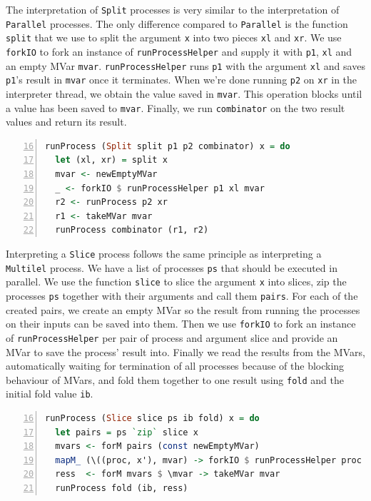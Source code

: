 The interpretation of \texttt{Split} processes is very similar to the interpretation of \texttt{Parallel} processes. The only difference compared to \texttt{Parallel} is the function \texttt{split} that we use to split the argument \texttt{x} into two pieces \texttt{xl} and \texttt{xr}. We use \texttt{forkIO} to fork an instance of \texttt{runProcessHelper} and supply it with \texttt{p1}, \texttt{xl} and an empty MVar \texttt{mvar}. \texttt{runProcessHelper} runs \texttt{p1} with the argument \texttt{xl} and saves \texttt{p1}'s result in \texttt{mvar} once it terminates. When we're done running \texttt{p2} on \texttt{xr} in the interpreter thread, we obtain the value saved in \texttt{mvar}. This operation blocks until a value has been saved to \texttt{mvar}. Finally, we run \texttt{combinator} on the two result values and return its result.
\begin{lstlisting}[language=Haskell,caption=Implementation of the interpreter for \texttt{Split} processes.,label=lst:local_runprocess_multilel,numbers=left,frame=bt,firstnumber=16]
runProcess (Split split p1 p2 combinator) x = do
  let (xl, xr) = split x
  mvar <- newEmptyMVar
  _ <- forkIO $ runProcessHelper p1 xl mvar
  r2 <- runProcess p2 xr
  r1 <- takeMVar mvar
  runProcess combinator (r1, r2)
\end{lstlisting}

Interpreting a \texttt{Slice} process follows the same principle as interpreting a \texttt{Multilel} process. We have a list of processes \texttt{ps} that should be executed in parallel. We use the function \texttt{slice} to slice the argument \texttt{x} into slices, zip the processes \texttt{ps} together with their arguments and call them \texttt{pairs}. For each of the created pairs, we create an empty MVar so the result from running the processes on their inputs can be saved into them. Then we use \texttt{forkIO} to fork an instance of \texttt{runProcessHelper} per pair of process and argument slice and provide an MVar to save the process' result into. Finally we read the results from the MVars, automatically waiting for termination of all processes because of the blocking behaviour of MVars, and fold them together to one result using \texttt{fold} and the initial fold value \texttt{ib}.
\begin{lstlisting}[language=Haskell,caption=Implementation of the interpreter for \texttt{Slice} processes.,label=lst:local_runprocess_multilel,numbers=left,frame=bt,firstnumber=16]
runProcess (Slice slice ps ib fold) x = do
  let pairs = ps `zip` slice x
  mvars <- forM pairs (const newEmptyMVar)
  mapM_ (\((proc, x'), mvar) -> forkIO $ runProcessHelper proc x' mvar) (pairs `zip` mvars)
  ress  <- forM mvars $ \mvar -> takeMVar mvar
  runProcess fold (ib, ress)
\end{lstlisting}

